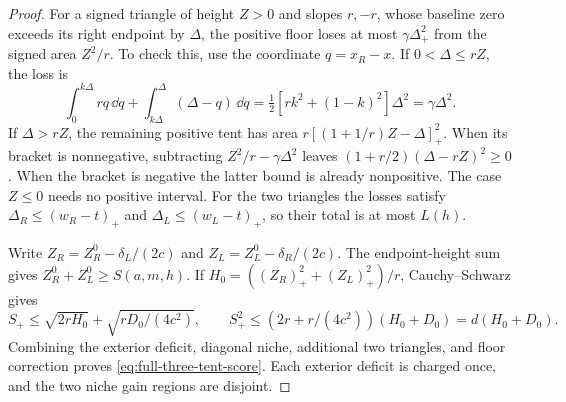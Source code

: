 \begin{proof}
For a signed triangle of height $Z>0$ and slopes $r,-r$, whose
baseline zero exceeds its right endpoint by $\Delta$, the positive
floor loses at most $\gamma\Delta_+^2$ from the signed area
$Z^2/r$. To check this, use the coordinate $q=x_R-x$.
If $0<\Delta\le rZ$, the loss is
\[
 \int_0^{k\Delta}rq\,\dd q+
 \int_{k\Delta}^{\Delta}(\Delta-q)\,\dd q
   =\tfrac12[rk^2+(1-k)^2]\Delta^2=\gamma\Delta^2.
\]
If $\Delta>rZ$, the remaining positive tent has area
$r[(1+1/r)Z-\Delta]_+^2$.
When its bracket is nonnegative, subtracting
$Z^2/r-\gamma\Delta^2$ leaves
$(1+r/2)(\Delta-rZ)^2\ge0$.
When the bracket is negative the latter bound is already
nonpositive. The case $Z\le0$ needs no positive interval.
For the two triangles the losses satisfy
$\Delta_R\le(w_R-t)_+$ and $\Delta_L\le(w_L-t)_+$,
so their total is at most $L(h)$.

Write $Z_R=Z_R^0-\delta_L/(2c)$ and
$Z_L=Z_L^0-\delta_R/(2c)$.
The endpoint-height sum gives $Z_R^0+Z_L^0\ge S(a,m,h)$.
If $H_0=((Z_R)_+^2+(Z_L)_+^2)/r$, Cauchy--Schwarz gives
\[
 S_+\le\sqrt{2rH_0}+\sqrt{rD_0/(4c^2)},\qquad
 S_+^2\le(2r+r/(4c^2))(H_0+D_0)=d(H_0+D_0).
\]
Combining the exterior deficit, diagonal niche, additional two
triangles, and floor correction proves
\cref{eq:full-three-tent-score}. Each exterior deficit is charged
once, and the two niche gain regions are disjoint.
\end{proof}

